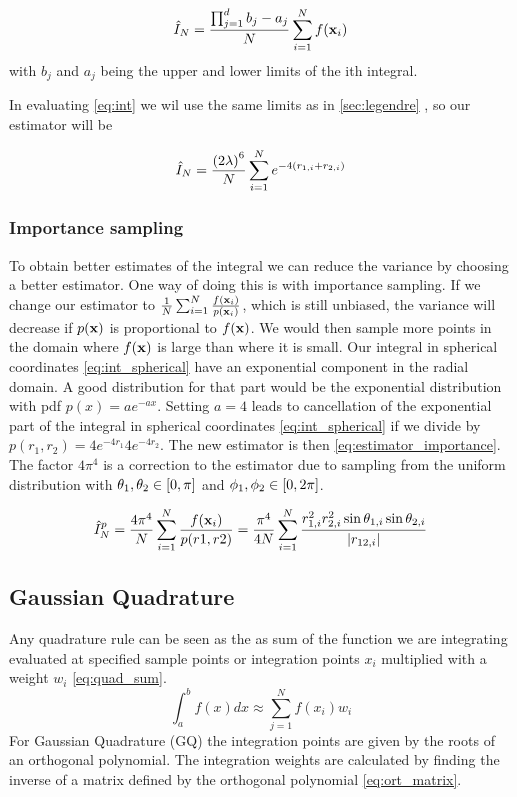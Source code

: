 \begin{equation}
  \label{eq:estimator_brute}
  \hat{I}_N
  = \frac{\prod_{j=1}^{d} b_j - a_j }{N}\sum_{i=1}^{N} f(\mathbf{x}_i)
\end{equation}
with $b_j$ and $a_j$ being the upper and lower limits of the ith integral.

In evaluating \cref{eq:int} we wil use the same limits as in \cref{sec:legendre}
, so our estimator will be

\begin{equation}
  \label{eq:estimator_brute_our}
  \hat{I}_N
  = \frac{\left(2\lambda\right)^6}{N} \sum_{i=1}^{N} e^{-4(r_{1,i} + r_{2,i})}
\end{equation}

\subsubsection{Importance sampling}

To obtain better estimates of the integral we can reduce the variance by
choosing a better estimator.
One way of doing this is with importance sampling. If we change our estimator to
$\frac{1}{N} \sum_{i=1}^{N} \frac{f(\mathbf{x}_i)}{p(\mathbf{x}_i)}$, which is still unbiased, the
variance will decrease if $p(\mathbf{x})$ is proportional to $f(\mathbf{x})$. We would then sample
more points in the domain where $f(\mathbf{x})$ is large than where it is small.
Our integral in spherical coordinates \cref{eq:int_spherical} have an exponential
component in the radial domain. A good distribution for that part would be
the exponential distribution with pdf $p(x) = ae^{-ax}$.
Setting $a = 4$ leads to cancellation of the exponential part of the integral in
spherical coordinates \cref{eq:int_spherical} if we divide by
$p(r_1,r_2) = 4e^{-4r_1} 4e^{-4r_2}$. The new estimator is then
\cref{eq:estimator_importance}. The factor $4\pi^4$ is a correction to the estimator due to sampling from the
uniform distribution with $\theta_1, \theta_2 \in \left[0, \pi\right]$ and
$\phi_1, \phi_2 \in \left[0, 2\pi\right]$.

\begin{equation}
  \label{eq:estimator_importance}
  \hat{I}_N^p
  = \frac{4\pi^4}{N} \sum_{i=1}^{N} \frac{f(\mathbf{x}_i)}{p(r1,r2)}
  = \frac{\pi^4}{4N} \sum_{i=1}^{N}
  \frac{r_{1,i}^2 r_{2,i}^2 \sin{\theta_{1,i}} \sin{\theta_{2,i}}}{\abs{r_{12,i}}}
\end{equation}


\subsection{Gaussian Quadrature}
Any quadrature rule can be seen as the as sum of the function we are
integrating evaluated at specified sample points or integration points $x_i$
multiplied with a weight $w_i$ \cref{eq:quad_sum}.
\begin{equation}\label{eq:quad_sum}
  \int_{a}^{b} f(x)dx \approx \sum_{j=1}^{N} f(x_i) w_i
\end{equation}
For Gaussian Quadrature (GQ) the
integration points are given by the roots of an orthogonal polynomial. The
integration weights are calculated by finding the inverse of a matrix defined by
the orthogonal polynomial \cref{eq:ort_matrix}.


